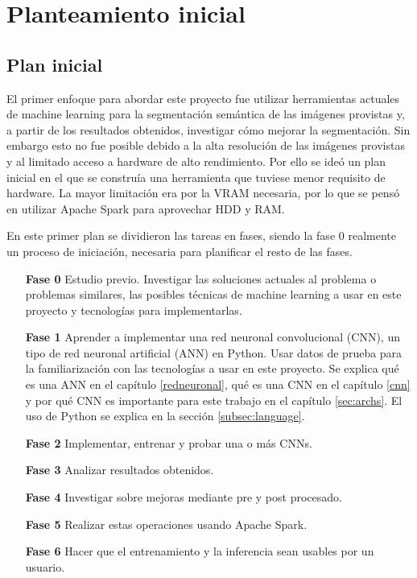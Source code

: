 \chapter{Planteamiento inicial}\label{planinicial}

\section{Plan inicial}\label{sec:planinicial}

El primer enfoque para abordar este proyecto fue utilizar herramientas actuales de machine learning para la segmentación semántica de las imágenes provistas y, a partir de los resultados obtenidos, investigar cómo mejorar la segmentación. Sin embargo esto no fue posible debido a la alta resolución de las imágenes provistas y al limitado acceso a hardware de alto rendimiento. Por ello se ideó un plan inicial en el que se construía una herramienta que tuviese menor requisito de hardware. La mayor limitación era por la VRAM necesaria, por lo que se pensó en utilizar Apache Spark \cite{apachespark} para aprovechar HDD y RAM.

En este primer plan se dividieron las tareas en fases, siendo la fase 0 realmente un proceso de iniciación, necesaria para planificar el resto de las fases.

\begin{itemize}
\item[\textbf{Fase 0}] Estudio previo. Investigar las soluciones actuales al problema o problemas similares, las posibles técnicas de machine learning a usar en este proyecto y tecnologías para implementarlas.
\item[\textbf{Fase 1}] Aprender a implementar una red neuronal convolucional (CNN), un tipo de red neuronal artificial (ANN) en Python. Usar datos de prueba para la familiarización con las tecnologías a usar en este proyecto. Se explica qué es una ANN en el capítulo \ref{redneuronal}, qué es una CNN en el capítulo \ref{cnn} y por qué CNN es importante para este trabajo en el capítulo \ref{sec:archs}. El uso de Python se explica en la sección \ref{subsec:language}.
\item[\textbf{Fase 2}] Implementar, entrenar y probar una o más CNNs.
\item[\textbf{Fase 3}] Analizar resultados obtenidos.
\item[\textbf{Fase 4}] Investigar sobre mejoras mediante pre y post procesado.
\item[\textbf{Fase 5}] Realizar estas operaciones usando Apache Spark.
\item[\textbf{Fase 6}] Hacer que el entrenamiento y la inferencia sean usables por un usuario.
\end{itemize}

